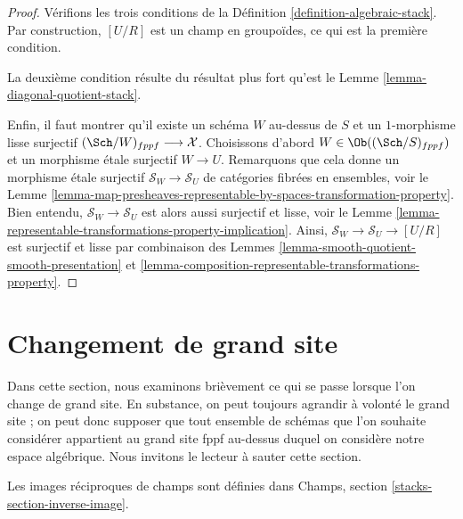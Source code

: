 \begin{proof}
Vérifions les trois conditions de la
Définition \ref{definition-algebraic-stack}.
Par construction, $[U/R]$ est un champ en groupoïdes,
ce qui est la première condition.

\medskip\noindent
La deuxième condition résulte du résultat plus fort qu'est le
Lemme \ref{lemma-diagonal-quotient-stack}.

\medskip\noindent
Enfin, il faut montrer qu'il existe un schéma $W$ au-dessus de $S$
et un $1$-morphisme lisse surjectif
$(\Sch/W)_{fppf} \longrightarrow \mathcal{X}$.
Choisissons d'abord $W \in \Ob((\Sch/S)_{fppf})$ et un
morphisme \'etale surjectif $W \to U$. Remarquons que cela
donne un morphisme \'etale surjectif $\mathcal{S}_W \to \mathcal{S}_U$
de catégories fibrées en ensembles, voir le
Lemme
\ref{lemma-map-presheaves-representable-by-spaces-transformation-property}.
Bien entendu, $\mathcal{S}_W \to \mathcal{S}_U$ est alors aussi surjectif et
lisse, voir le
Lemme \ref{lemma-representable-transformations-property-implication}.
Ainsi, $\mathcal{S}_W \to \mathcal{S}_U \to [U/R]$ est surjectif
et lisse par combinaison des
Lemmes \ref{lemma-smooth-quotient-smooth-presentation} et
\ref{lemma-composition-representable-transformations-property}.
\end{proof}





\section{Changement de grand site}
\label{section-change-big-site}

\noindent
Dans cette section, nous examinons brièvement ce qui se passe lorsque l'on change de grand site.
En substance, on peut toujours agrandir à volonté le grand site ; on peut donc
supposer que tout ensemble de schémas que l'on souhaite considérer appartient au grand
site fppf au-dessus duquel on considère notre espace algébrique.
Nous invitons le lecteur à sauter cette section.

\medskip\noindent
Les images réciproques de champs sont définies dans
Champs, section \ref{stacks-section-inverse-image}.

